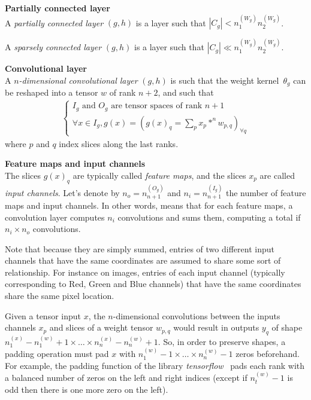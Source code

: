 \begin{definition}\textbf{Partially connected layer}\\
A \emph{partially connected layer} $(g,h)$ is a layer such that $|C_g| < n_1^{(W_g)} n_2^{(W_g)}$.

A \emph{sparsely connected layer} $(g,h)$ is a layer such that $|C_g| \ll n_1^{(W_g)} n_2^{(W_g)}$.
\end{definition}

\begin{definition}\textbf{Convolutional layer}\\
A \emph{$n$-dimensional convolutional layer} $(g,h)$ is such that the weight kernel~$\theta_g$ can be reshaped into a tensor $w$ of rank $n+2$, and such that
\begin{gather*}
\left\{
\begin{array}{l}
  I_g \mbox{ and } O_g \mbox{ are tensor spaces of rank }n+1 \\
  \forall x \in I_g, g(x) = (g(x)_q = \sum\limits_p{x_p \ast^n w_{p,q}})_{\forall q}
\end{array}
\right.
\end{gather*}
where $p$ and $q$ index slices along the last ranks.
\label{def:convlayer}
\end{definition}

\begin{definition}\textbf{Feature maps and input channels}\\
The slices $g(x)_q$ are typically called \textit{feature maps}, and the slices $x_p$ are called \textit{input channels}. Let's denote by $n_o = n_{n+1}^{(O_g)}$ and $n_i =n_{n+1}^{(I_g)}$ the number of feature maps and input channels.
In other words,  means that for each feature maps, a convolution layer computes $n_i$ convolutions and sums them, computing a total if $n_i \times n_o$ convolutions.
\end{definition}

\begin{remark}
Note that because they are simply summed, entries of two different input channels that have the same coordinates are assumed to share some sort of relationship. For instance on images, entries of each input channel (typically corresponding to Red, Green and Blue channels) that have the same coordinates share the same pixel location.
\end{remark}

\begin{remark}
Given a tensor input $x$, the $n$-dimensional convolutions between the inputs channels $x_p$ and slices of a weight tensor $w_{p,q}$ would result in outputs $y_q$ of shape $n_1^{(x)} - n_1^{(w)} + 1 \times \ldots \times n_n^{(x)} - n_n^{(w)} + 1$. So, in order to preserve shapes, a padding operation must pad $x$ with $n_1^{(w)} - 1 \times \ldots \times n_n^{(w)} - 1$ zeros beforehand. For example, the padding function of the library \emph{tensorflow}~\citep{tensorflow2015-whitepaper} pads each rank with a balanced number of zeros on the left and right indices (except if $n_t^{(w)} - 1$ is odd then there is one more zero on the left).
\end{remark}

